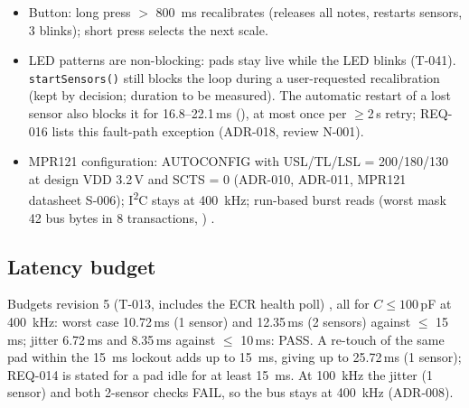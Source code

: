 \begin{itemize}[noitemsep]
        registers itself and checks the transaction result
        .
  \item Button: long press $>$ \qty{800}{\milli\second} recalibrates (releases all
        notes, restarts sensors, 3 blinks); short press selects the next scale.
  \item LED patterns are non-blocking: pads stay live while the LED blinks (T-041).
        \texttt{startSensors()} still blocks the loop during a user-requested
        recalibration (kept by decision; duration to be measured). The automatic
        restart of a lost sensor also blocks it for 16.8--22.1\,ms (),
        at most once per $\ge$2\,s retry; REQ-016 lists this fault-path exception
        (ADR-018, review N-001).
  \item MPR121 configuration: AUTOCONFIG with USL/TL/LSL = 200/180/130 at design
        VDD 3.2\,V and SCTS = 0 (ADR-010, ADR-011,  MPR121 datasheet
        S-006); I\textsuperscript{2}C stays at \qty{400}{\kilo\hertz}; run-based
        burst reads (worst mask 42 bus bytes in 8 transactions, )
        .
\end{itemize}

\subsection{Latency budget}
Budgets revision 5 (T-013, includes the ECR health poll) 
, all  for $C \le 100$\,pF at
\qty{400}{\kilo\hertz}: worst case 10.72\,ms (1 sensor) and 12.35\,ms (2 sensors)
against $\le$ 15\,ms; jitter 6.72\,ms and 8.35\,ms against $\le$ 10\,ms: PASS. A
re-touch of the same pad within the \qty{15}{\milli\second} lockout adds up to
\qty{15}{\milli\second}, giving up to 25.72\,ms (1 sensor); REQ-014 is stated for a
pad idle for at least \qty{15}{\milli\second}. At \qty{100}{\kilo\hertz} the jitter
(1 sensor) and both 2-sensor checks FAIL, so the bus stays at \qty{400}{\kilo\hertz}
(ADR-008).

